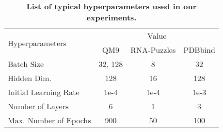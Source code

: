 \documentclass[fleqn,10pt]{wlscirep}
\begin{document}
\begin{table}[ht]
\centering
\begin{tabular}{lccc}
    \toprule
    \multirow{2}{*}{Hyperparameters} & \multicolumn{3}{c}{Value}\\
      & QM9 & RNA-Puzzles & PDBbind\\
    \midrule
    Batch Size & 32, 128 & 8 & 32\\
    Hidden Dim. & 128 & 16 & 128\\
    Initial Learning Rate & 1e-4 & 1e-4 & 1e-3\\
    Number of Layers & 6 & 1 & 3\\
    Max. Number of Epochs & 900 & 50 & 100\\
    \bottomrule
\end{tabular}
\caption{\textbf{List of typical hyperparameters used in our experiments.}}
\label{table:hyperparameter}
\end{table}
\end{document}
